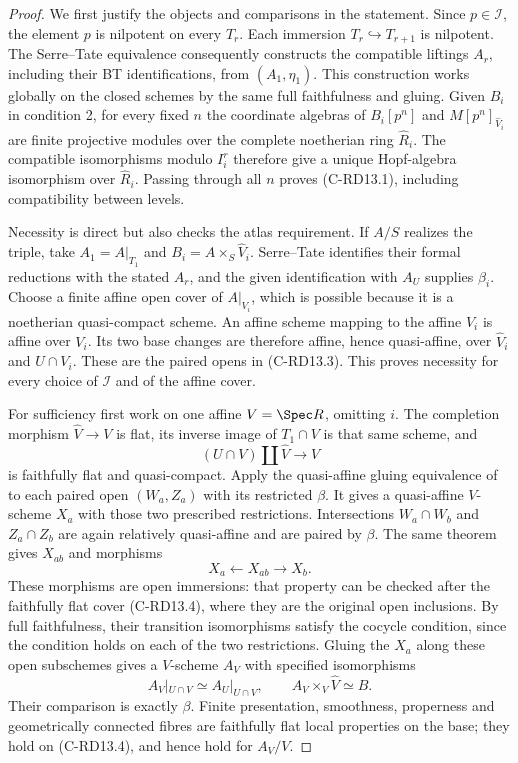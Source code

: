 \begin{proof}
We first justify the objects and comparisons in the statement.
Since $p\in\mathcal I$, the element $p$ is nilpotent on every $T_r$.
Each immersion $T_r\hookrightarrow T_{r+1}$ is nilpotent. The
Serre--Tate equivalence
\cite[Theorem~1.2.1]{Katz1981SerreTate} consequently constructs the
compatible liftings $A_r$, including their BT identifications, from
$(A_1,\eta_1)$. This construction works globally on the closed
schemes by the same full faithfulness and gluing. Given $B_i$ in
condition 2, for every fixed $n$ the coordinate algebras of
$B_i[p^n]$ and $M[p^n]_{\widehat V_i}$ are finite projective modules
over the complete noetherian ring $\widehat R_i$. The compatible
isomorphisms modulo $I_i^r$ therefore give a unique Hopf-algebra
isomorphism over $\widehat R_i$. Passing through all $n$ proves
(C-RD13.1), including compatibility between levels.

Necessity is direct but also checks the atlas requirement. If $A/S$
realizes the triple, take $A_1=A|_{T_1}$ and
$B_i=A\times_S\widehat V_i$. Serre--Tate identifies their formal
reductions with the stated $A_r$, and the given identification with
$A_U$ supplies $\beta_i$. Choose a finite affine open cover of
$A|_{V_i}$, which is possible because it is a noetherian
quasi-compact scheme. An affine scheme mapping to the affine $V_i$
is affine over $V_i$. Its two base changes are therefore affine,
hence quasi-affine, over $\widehat V_i$ and $U\cap V_i$. These are
the paired opens in (C-RD13.3). This proves necessity for every
choice of $\mathcal I$ and of the affine cover.

For sufficiency first work on one affine $V=\Spec R$, omitting $i$.
The completion morphism $\widehat V\to V$ is flat, its inverse image
of $T_1\cap V$ is that same scheme, and
\[
             (U\cap V)\amalg\widehat V\longrightarrow V
                                                        \tag{C-RD13.4}
\]
is faithfully flat and quasi-compact. Apply the quasi-affine gluing
equivalence of \cite[Theorem~1.1, p.565]{MoretBailly1996Descent}
to each paired open $(W_a,Z_a)$ with its restricted $\beta$.
It gives a quasi-affine $V$-scheme $X_a$ with those two prescribed
restrictions. Intersections $W_a\cap W_b$ and $Z_a\cap Z_b$ are
again relatively quasi-affine and are paired by $\beta$. The same
theorem gives $X_{ab}$ and morphisms
\[
                         X_a\longleftarrow X_{ab}\longrightarrow X_b.
\]
These morphisms are open immersions: that property can be checked
after the faithfully flat cover (C-RD13.4), where they are the
original open inclusions. By full faithfulness, their transition
isomorphisms satisfy the cocycle condition, since the condition
holds on each of the two restrictions. Gluing the $X_a$ along these
open subschemes gives a $V$-scheme $A_V$ with specified isomorphisms
\[
 A_V|_{U\cap V}\simeq A_U|_{U\cap V},\qquad
 A_V\times_V\widehat V\simeq B.
                                                        \tag{C-RD13.5}
\]
Their comparison is exactly $\beta$. Finite presentation, smoothness,
properness and geometrically connected fibres are faithfully flat
local properties on the base; they hold on (C-RD13.4), and hence
hold for $A_V/V$.


\end{proof}
